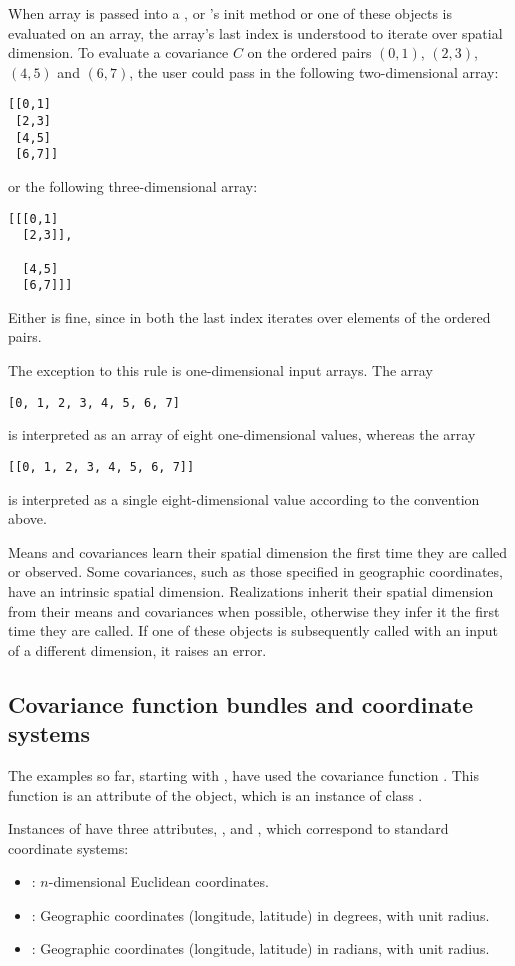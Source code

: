 \documentclass[article]{jss}
\begin{document}
When array is passed into a ,  or 's init method or one of these objects is evaluated on an array, the array's last index is understood to iterate over spatial dimension. To evaluate a covariance $C$ on the ordered pairs $(0,1)$, $(2,3)$, $(4,5)$ and $(6,7)$, the user could pass in the following two-dimensional  array:
\begin{verbatim}
[[0,1]
 [2,3]
 [4,5]
 [6,7]]
\end{verbatim}
or the following three-dimensional array:
\begin{verbatim}
[[[0,1]
  [2,3]],

  [4,5]
  [6,7]]]
\end{verbatim}
Either is fine, since in both the last index iterates over elements of the ordered pairs.

The exception to this rule is one-dimensional input arrays. The array
\begin{verbatim}
[0, 1, 2, 3, 4, 5, 6, 7]
\end{verbatim}
is interpreted as an array of eight one-dimensional values, whereas the array
\begin{verbatim}
[[0, 1, 2, 3, 4, 5, 6, 7]]
\end{verbatim}
is interpreted as a single eight-dimensional value according to the convention above.

Means and covariances learn their spatial dimension the first time they are called or observed. Some covariances, such as those specified in geographic coordinates, have an intrinsic spatial dimension. Realizations inherit their spatial dimension from their means and covariances when possible, otherwise they infer it the first time they are called. If one of these objects is subsequently called with an input of a different dimension, it raises an error.

\subsection{Covariance function bundles and coordinate systems}
The examples so far, starting with , have used the covariance function . This function is an attribute of the  object, which is an instance of class .

Instances of  have three attributes, ,  and , which correspond to standard coordinate systems:
\begin{itemize}
    \item {}: $n$-dimensional Euclidean coordinates.
    \item {}: Geographic coordinates (longitude, latitude) in degrees, with unit radius.
    \item {}: Geographic coordinates (longitude, latitude) in radians, with unit radius.
\end{itemize}
\end{document}

